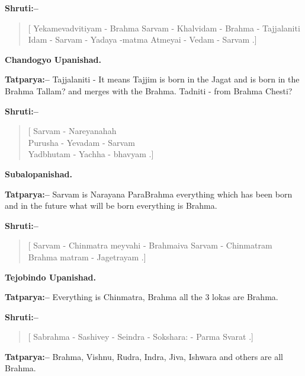 \textbf{Shruti:–}

\begin{verse}
[ Yekamevadvitiyam - Brahma  Sarvam - Khalvidam - Brahma - Tajjalaniti Idam - Sarvam - Yadaya -\break matma  Atmeyai - Vedam - Sarvam .]
\end{verse}

\begin{flushright}
\textbf{Chandogyo Upanishad.}
\end{flushright}

\textbf{Tatparya:–} Tajjalaniti - It means Tajjim is born in the Jagat and is born in the Brahma Tallam? and merges with the Brahma. Tadniti - from Brahma Chesti?

\textbf{Shruti:–}

\begin{verse}
[ Sarvam - Nareyanahah \\ Purusha - Yevadam - Sarvam \\ Yadbhutam - Yachha - bhavyam .]
\end{verse}

\begin{flushright}
\textbf{Subalopanishad.}
\end{flushright}

\textbf{Tatparya:–} Sarvam is Narayana ParaBrahma everything which has been born and in the future what will be born everything is Brahma.

\textbf{Shruti:–}

\begin{verse}
[ Sarvam - Chinmatra meyvahi - Brahmaiva Sarvam - Chinmatram  Brahma matram - Jagetrayam .]
\end{verse}

\begin{flushright}
\textbf{Tejobindo Upanishad.}
\end{flushright}

\textbf{Tatparya:–} Everything is Chinmatra, Brahma all the 3 lokas are Brahma.

\newpage

\textbf{Shruti:–}

\begin{verse}
[ Sabrahma - Sashivey - Seindra - Sokshara: - Parma Svarat .]
\end{verse}

\textbf{Tatparya:–} Brahma, Vishnu, Rudra, Indra, Jiva, Ishwara and others are all Brahma.

